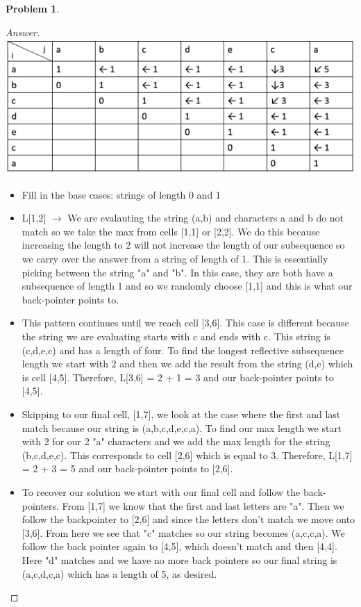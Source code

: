 \documentclass[11pt]{article}
\theoremstyle{definition}
\theoremstyle{definition}
\newtheorem{required}{Problem}
\theoremstyle{definition}
\begin{document}
\begin{required}
\begin{enumerate}[label=(\alph*)]
\begin{proof}[Answer] $ $ \\
\includegraphics[width =170mm]{table2.png} \\
\begin{itemize}
    \item Fill in the base cases: strings of length 0 and 1
    \item L[1,2] $\to$ We are evalauting the string (a,b) and characters a and b do not match so we take the max from cells [1,1] or [2,2]. We do this because increasing the length to 2 will not increase the length of our subsequence so we carry over the answer from a string of length of 1. This is essentially picking between the string "a" and "b". In this case, they are both have a subsequence of length 1 and so we randomly choose [1,1] and this is what our back-pointer points to. 
    \item This pattern continues until we reach cell [3,6]. This case is different because the string we are evaluating starts with c and ends with c. This string is (c,d,e,c) and has a length of four. To find the longest reflective subsequence length we start with 2 and then we add the result from the string (d,e) which is cell [4,5]. Therefore, L[3,6] = 2 + 1 = 3 and our back-pointer points to [4,5]. 
    \item Skipping to our final cell, [1,7], we look at the case where the first and last match because our string is (a,b,c,d,e,c,a). To find our max length we start with 2 for our 2 "a" characters and we add the max length for the string (b,c,d,e,c). This corresponds to cell [2,6] which is equal to 3. Therefore, L[1,7] = 2 + 3 = 5 and our back-pointer points to [2,6]. 
    \item To recover our solution we start with our final cell and follow the back-pointers. From [1,7] we know that the first and last letters are "a". Then we follow the backpointer to [2,6] and since the letters don't match we move onto [3,6]. From here we see that "c" matches so our string becomes (a,c,c,a). We follow the back pointer again to [4,5], which doesn't match and then [4,4]. Here "d" matches and we have no more back pointers so our final string is (a,c,d,c,a) which has a length of 5, as desired. 
\end{itemize}
\end{proof}

\end{enumerate}



\end{required}
\end{document}

